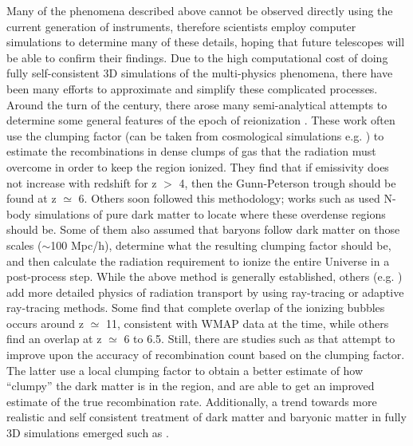 \documentclass[letterpaper,10pt]{article}
\renewcommand{\(}{\left(}
\renewcommand{\)}{\right)}
\begin{document}
Many of the phenomena described above cannot be observed directly
using the current generation of instruments, therefore scientists
employ computer simulations to determine many of these details, hoping
that future telescopes will be able to confirm their findings.  Due to
the high computational cost of doing fully self-consistent 3D
simulations of the multi-physics phenomena, there have been many
efforts to approximate and simplify these complicated processes.
Around the turn of the century, there arose many semi-analytical 
attempts to determine some general features of the epoch of
reionization \citep{ValageasSilk1999, MadauHaardtRees1999, MiraldaEscudeHaehneltRees2000}.  
These work often use the clumping factor (can be taken from
cosmological simulations e.g. \citealt{GnedinOstriker1997}) to
estimate the recombinations in dense clumps of gas that the radiation
must overcome in order to keep the region ionized.  They find that if
emissivity does not increase with redshift for z $>$ 4, then the
Gunn-Peterson trough should be found at z $\simeq$ 6.  Others soon
followed this methodology; works such as 
\citep{Ciardietal2003, Ilievetal2006, Zahnetal2007} used N-body
simulations of pure dark matter to locate where these overdense regions
should be.  Some of them also assumed that baryons follow dark matter on those
scales ($\sim$100 Mpc/h), determine what
the resulting clumping factor should be, and then calculate the
radiation requirement to ionize the entire Universe in a post-process
step.  While the above method is generally established, others
(e.g. \citealt{Ilievetal2006, TracCen2007}) add more detailed physics
of radiation transport by using ray-tracing or adaptive ray-tracing
methods.  Some find that complete overlap of the ionizing bubbles
occurs around z $\simeq$ 11, consistent with WMAP data at the 
time, while others find an overlap at z $\simeq$ 6 to 6.5.  Still,
there are studies such as \citep{PawlikEtal2009, RaicevicTheuns2011} 
that attempt to improve upon the accuracy of recombination count based on the clumping
factor.  The latter use a local clumping factor to obtain a better estimate
of how ``clumpy'' the dark matter is in the region, and are able to
get an improved estimate of the true recombination rate.  Additionally, a trend towards
more realistic and self consistent treatment of dark matter and
baryonic matter in fully 3D simulations emerged such as \citep{PetkovaSpringel2011a, 
PetkovaSpringel2011b}. 

\end{document}
